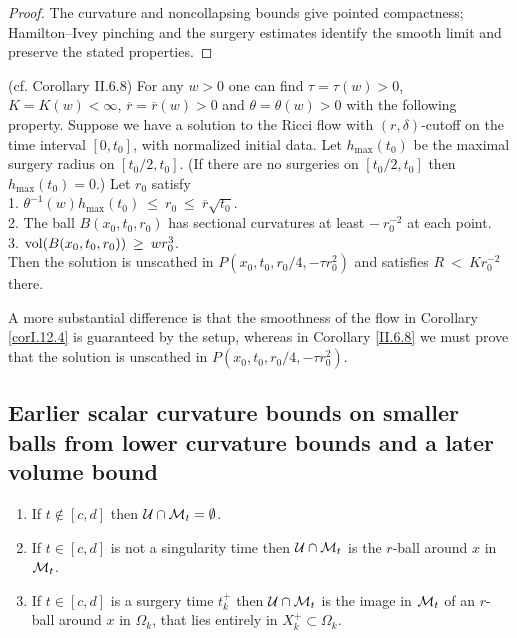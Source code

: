 \begin{proof}
\sketch The curvature and noncollapsing bounds give pointed compactness; Hamilton--Ivey pinching and the surgery estimates identify the smooth limit and preserve the stated properties.
\end{proof}

\begin{corollary}
  \label{cor:kl-double-sided-curvature-bound-thick-part-existence-ricci-flow-surgery}
 \label{II.6.8}
(cf. Corollary II.6.8) For any $w > 0$ one can find
$\tau = \tau(w) > 0$, $K = K(w) < \infty$,
$\overline{r} = \overline{r}(w) > 0$ and $\theta = \theta(w) > 0$ with
the following property. Suppose we have a solution to the Ricci flow
with $(r, \delta)$-cutoff on the time interval $[0, t_0]$, with
normalized initial data.
Let $h_{\max}(t_0)$ be the maximal surgery radius on $[t_0/2, t_0]$.
(If there are no surgeries on $[t_0/2, t_0]$ then $h_{\max}(t_0) = 0$.)
Let $r_0$ satisfy \\
1. $\theta^{-1}(w) h_{\max}(t_0) \: \le \: r_0 \: \le \:
\overline{r} \sqrt{t_0}$.\\
2. The ball $B(x_0, t_0, r_0)$ has sectional curvatures at least
$- \: r_0^{-2}$ at each point.\\
3. $\operatorname{vol}(B(x_0, t_0, r_0)) \: \ge \: w r_0^3$.\\

Then the solution is unscathed in $P(x_0, t_0, r_0/4, - \tau r_0^2)$
and satisfies $R \: < \: Kr_0^{-2}$ there.
\end{corollary}

A more substantial difference is that the smoothness of the flow
in Corollary \ref{corI.12.4}
is guaranteed by the setup, whereas in Corollary \ref{II.6.8} we must
prove that the solution is unscathed in $P(x_0, t_0, r_0/4, - \tau r_0^2)$.

\subsection{Earlier scalar curvature bounds on smaller balls from lower curvature bounds and a later volume bound}
 \label{II.6.5}

\begin{enumerate}
\item If $t \notin [c,d]$ then ${\mathcal U} \cap {\mathcal M}_t = \emptyset$.
\item If $t \in [c,d]$ is not
a singularity time then ${\mathcal U} \cap {\mathcal M}_t$ is the $r$-ball around $x$ in
${\mathcal M}_t$.
\item If $t \in [c,d]$ is a surgery time $t_k^+$ then
${\mathcal U} \cap {\mathcal M}_t$ is
the image in ${\mathcal M}_t$ of an $r$-ball around $x$ in
$\Omega_k$, that lies entirely in $X_k^+ \subset \Omega_k$.
\end{enumerate}

